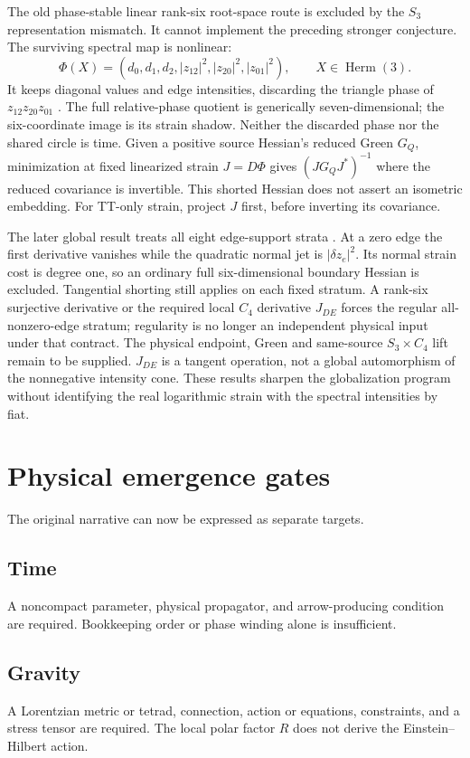 \documentclass[11pt]{article}
\begin{document}
\label{sec:consumer-strain}
The old phase-stable linear rank-six root-space route is excluded by the
$S_3$ representation mismatch. It cannot implement the preceding stronger
conjecture. The surviving spectral map is nonlinear:
\[
 \Phi(X)=(d_0,d_1,d_2,|z_{12}|^2,|z_{20}|^2,|z_{01}|^2),
 \qquad X\in\operatorname{Herm}(3).
\]
It keeps diagonal values and edge intensities, discarding the triangle phase
of $z_{12}z_{20}z_{01}$ \cite{FrozenStrain}. The full relative-phase
quotient is generically seven-dimensional; the six-coordinate image is its
strain shadow. Neither the discarded phase nor the shared circle is time.
Given a positive source Hessian's reduced Green $G_Q$, minimization at fixed
linearized strain $J=D\Phi$ gives $(JG_QJ^*)^{-1}$ where the reduced covariance
is invertible.
This shorted Hessian does not assert an isometric embedding. For TT-only
strain, project $J$ first, before inverting its covariance.

The later global result treats all eight edge-support strata
\cite{FrozenSupport}. At a zero edge the first derivative vanishes while the
quadratic normal jet is $|\delta z_e|^2$. Its normal strain cost is degree
one, so an ordinary full six-dimensional boundary Hessian is excluded.
Tangential shorting still applies on each fixed stratum. A rank-six
surjective derivative or the required local $C_4$ derivative $J_{DE}$ forces
the regular all-nonzero-edge stratum; regularity is no longer an independent
physical input under that contract. The physical endpoint, Green and
same-source $S_3\times C_4$ lift remain to be supplied. $J_{DE}$ is a tangent
operation, not a global automorphism of the nonnegative intensity cone.
These results sharpen the globalization program without identifying the real
logarithmic strain with the spectral intensities by fiat.

\section{Physical emergence gates}

The original narrative can now be expressed as separate targets.

\subsection{Time}
A noncompact parameter, physical propagator, and arrow-producing condition are
required.  Bookkeeping order or phase winding alone is insufficient.

\subsection{Gravity}
A Lorentzian metric or tetrad, connection, action or equations, constraints,
and a stress tensor are required.  The local polar factor $R$ does not derive
the Einstein--Hilbert action.
\end{document}
